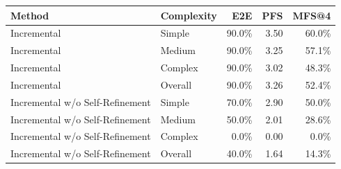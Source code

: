 \begin{tabular}{llrrr}
\toprule
Method & Complexity & E2E & PFS & MFS@4 \\
\midrule
Incremental & Simple & 90.0\% & 3.50 & 60.0\% \\
Incremental & Medium & 90.0\% & 3.25 & 57.1\% \\
Incremental & Complex & 90.0\% & 3.02 & 48.3\% \\
Incremental & Overall & 90.0\% & 3.26 & 52.4\% \\
Incremental w/o Self-Refinement & Simple & 70.0\% & 2.90 & 50.0\% \\
Incremental w/o Self-Refinement & Medium & 50.0\% & 2.01 & 28.6\% \\
Incremental w/o Self-Refinement & Complex & 0.0\% & 0.00 & 0.0\% \\
Incremental w/o Self-Refinement & Overall & 40.0\% & 1.64 & 14.3\% \\
\bottomrule
\end{tabular}
